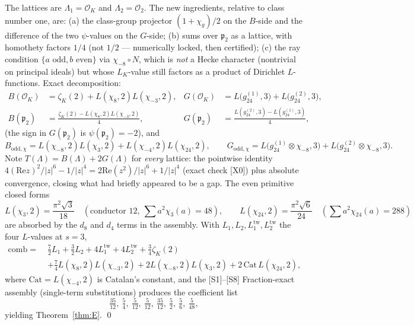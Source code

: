\documentclass[11pt]{article}
\newcommand{\OO}{\mathcal{O}}
\newcommand{\ReT}{\mathrm{Re}}
\theoremstyle{definition}
\theoremstyle{remark}
\begin{document}
The lattices are $\Lambda_1=\OO_K$ and $\Lambda_2=\OO_2$. The new
ingredients, relative to class number one, are: (a) the class-group
projector $(1+\chi_g)/2$ on the $B$-side and the difference of the
two $\psi$-values on the $G$-side; (b) sums over $\mathfrak p_2$ as a
lattice, with homothety factors $1/4$ (not $1/2$ --- numerically
locked, then certified); (c) the ray condition
$\{a\text{ odd},b\text{ even}\}$ via $\chi_{-8}\circ N$, which is
\emph{not} a Hecke character (nontrivial on principal ideals) but
whose $L_K$-value still factors as a product of Dirichlet
$L$-functions. Exact decomposition:
\begin{align*}
  B(\OO_K)&=\zeta_K(2)+L(\chi_8,2)L(\chi_{-3},2),&
  G(\OO_K)&=L\bigl(g_{24}^{(1)},3\bigr)+L\bigl(g_{24}^{(2)},3\bigr),\\
  B(\mathfrak p_2)&=\frac{\zeta_K(2)-L(\chi_8,2)L(\chi_{-3},2)}4,&
  G(\mathfrak p_2)&=\frac{L(g_{24}^{(2)},3)-L(g_{24}^{(1)},3)}4,
\end{align*}
(the sign in $G(\mathfrak p_2)$ is $\psi(\mathfrak p_2)=-2$), and
\[
  B_{\mathrm{odd},\chi}=L(\chi_{-8},2)L(\chi_{3},2)
   +L(\chi_{-4},2)L(\chi_{24},2),\qquad
  G_{\mathrm{odd},\chi}=L\bigl(g_{24}^{(1)}\otimes\chi_{-8},3\bigr)
   +L\bigl(g_{24}^{(2)}\otimes\chi_{-8},3\bigr).
\]
Note $T(\Lambda)=B(\Lambda)+2G(\Lambda)$ for \emph{every} lattice:
the pointwise identity $4(\ReT z)^2/|z|^6-1/|z|^4
=2\ReT(z^2)/|z|^6+1/|z|^4$ (exact check [X0]) plus absolute
convergence, closing what had briefly appeared to be a gap. The even
primitive closed forms \cite{Wa}
\[
  L(\chi_3,2)=\frac{\pi^2\sqrt3}{18}\quad
  (\text{conductor }12,\ \textstyle\sum a^2\chi_3(a)=48),\qquad
  L(\chi_{24},2)=\frac{\pi^2\sqrt6}{24}\quad
  (\textstyle\sum a^2\chi_{24}(a)=288)
\]
are absorbed by the $d_8$ and $d_4$ terms in the assembly. With
$L_1,L_2,L_1^{\mathrm{tw}},L_2^{\mathrm{tw}}$ the four $L$-values at
$s=3$,
\begin{align*}
  \mathrm{comb}=\;&\frac72L_1+\frac32L_2+4L_1^{\mathrm{tw}}
   +4L_2^{\mathrm{tw}}+\frac34\zeta_K(2)\\
   &+\frac74L(\chi_8,2)L(\chi_{-3},2)
   +2L(\chi_{-8},2)L(\chi_3,2)+2\,\mathrm{Cat}\,L(\chi_{24},2),
\end{align*}
where $\mathrm{Cat}=L(\chi_{-4},2)$ is Catalan's constant,
and the [S1]--[S8] Fraction-exact assembly (single-term substitutions)
produces the coefficient list
\[
  \tfrac{35}{12},\ \tfrac54,\ \tfrac{5}{12},\ \tfrac{5}{12},\
  \tfrac{35}{12},\ \tfrac52,\ \tfrac56,\ \tfrac{5}{48},
\]
yielding Theorem~\ref{thm:E}. \qed
\end{document}
